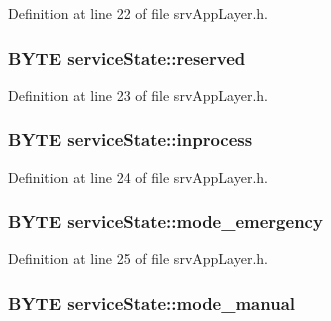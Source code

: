 Definition at line 22 of file srvAppLayer.h.

\hypertarget{structserviceState_a8717ec19a9ae6e498162aeb27383e754}{
\subsubsection[{reserved}]{\setlength{\rightskip}{0pt plus 5cm}BYTE {\bf serviceState::reserved}}}
\label{db/d35/structserviceState_a8717ec19a9ae6e498162aeb27383e754}


Definition at line 23 of file srvAppLayer.h.

\hypertarget{structserviceState_ace4544bc3fe8f584b9d6587998fbb8df}{
\subsubsection[{inprocess}]{\setlength{\rightskip}{0pt plus 5cm}BYTE {\bf serviceState::inprocess}}}
\label{db/d35/structserviceState_ace4544bc3fe8f584b9d6587998fbb8df}


Definition at line 24 of file srvAppLayer.h.

\hypertarget{structserviceState_a2d16ebd2d557bc59a64381256ca91ff5}{
\subsubsection[{mode\_\-emergency}]{\setlength{\rightskip}{0pt plus 5cm}BYTE {\bf serviceState::mode\_\-emergency}}}
\label{db/d35/structserviceState_a2d16ebd2d557bc59a64381256ca91ff5}


Definition at line 25 of file srvAppLayer.h.

\hypertarget{structserviceState_ad3bdd4769b24a8771b74270bf9dc0745}{
\subsubsection[{mode\_\-manual}]{\setlength{\rightskip}{0pt plus 5cm}BYTE {\bf serviceState::mode\_\-manual}}}
\label{db/d35/structserviceState_ad3bdd4769b24a8771b74270bf9dc0745}


